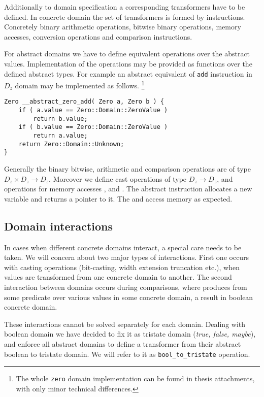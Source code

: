 Additionally to domain specification a corresponding transformers have to be
defined. In concrete domain the set of transformers is formed by \LLVM
instructions. Concretely binary arithmetic operations, bitwise binary
operations, memory accesses, conversion operations and comparison instructions.

For abstract domains we have to define equivalent operations over the abstract
values. Implementation of the operations may be provided as \Cpp{} functions over
the defined abstract types. For example an abstract equivalent of \texttt{add}
instruction in $D_z$ domain may be implemented as follows. \footnote{The whole
\texttt{zero} domain implementation can be found in thesis attachments, with
only minor technical differences.}
\begin{verbatim}
Zero __abstract_zero_add( Zero a, Zero b ) {
    if ( a.value == Zero::Domain::ZeroValue )
        return b.value;
    if ( b.value == Zero::Domain::ZeroValue )
        return a.value;
    return Zero::Domain::Unknown;
}
\end{verbatim}

Generally the binary bitwise, arithmetic and comparison operations are of
type $D_z \times D_z \to D_z$. Moreover we define cast operations of type $D_z \to D_z$,
and operations for memory accesses ,  and . The abstract  instruction allocates a new 
variable and returns a pointer to it. The  and  access memory as expected.

\subsection{Domain interactions} \label{sec:interactions}
In cases when different concrete domains interact, a special care needs to be
taken. We will concern about two major types of interactions. First one occurs
with casting operations (bit-casting, width extension truncation etc.), when
values are transformed from one concrete domain to another. The second
interaction between domains occurs during comparisons, where \LLVM produces from
some predicate over various values in some concrete domain, a result in boolean
concrete domain.

These interactions cannot be solved separately for each domain. Dealing with
boolean domain we have decided to fix it as tristate domain (\emph{true, false, maybe}),
and enforce all abstract domains to define a transformer from their abstract
boolean to tristate domain. We will refer to it as \texttt{bool\_to\_tristate}
operation.

